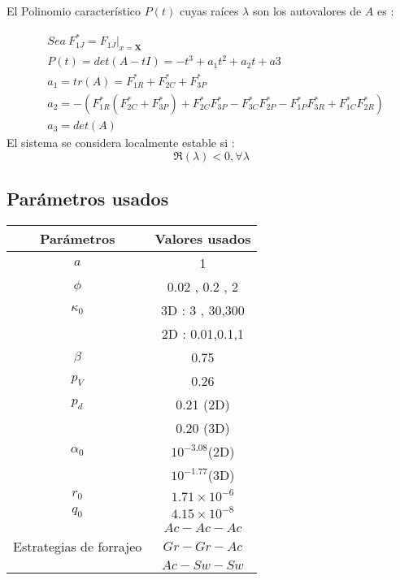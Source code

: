 El Polinomio caracter\'istico $P(t)$ cuyas ra\'ices $\lambda$ son los autovalores de $A$ es :

\begin{equation}
\begin{aligned}
& Sea \ F^*_{1J} = \left. F_{1J}\right|_{x=\mathbf{X}} \\
&P(t) = det(A-tI) = - t^3 + a_1t^2 + a_2 t + a3 \\
& a_1 = tr(A) = F^*_{1R}  + F^*_{2C} + F^*_{3P} \\
& a_2 =  -(F^*_{1R}(F^*_{2C}+F^*_{3P}) + F^*_{2C}F^*_{3P} - F^*_{3C}F^*_{2P} - F^*_{1P}F^*_{3R} + F^*_{1C}F^*_{2R}) \\
& a_3 = det(A) 
\end{aligned}
\end{equation}
El sistema se considera localmente estable \citep{yodzis1989introduction} si :
\begin{equation}\label{eq:estab}
\Re(\lambda) < 0 , \forall  \lambda
\end{equation}

\subsection{Par\'ametros usados}\label{subsec:params}
\begin{table}
\begin{longtable}{|c|c|}
\hline
Par\'ametros & Valores usados \\
\hline
$a$ & 1 \\
$\phi$ & 0.02 , 0.2 , 2 \\
\hline
$\kappa_0$ & 3D : 3 , 30,300 \\
   & 2D : 0.01,0.1,1 \\
\hline
$\beta$ & 0.75\\
\hline
$p_V$ & 0.26 \\
$p_d$ & 0.21 (2D) \\
      & 0.20 (3D) \\
\hline
$\alpha_0$ & $10^{-3.08}$(2D) \\
         & $10^{-1.77}$(3D) \\
\hline
$r_0$ & $1.71 \times 10^{-6}$ \\
\hline
$q_0$ & $4.15 \times 10^{-8}$\\
\hline
& $Ac-Ac-Ac$ \\
Estrategias de forrajeo& $Gr-Gr-Ac$ \\
& $Ac-Sw-Sw$ \\
\hline
\end{longtable}
\end{table}
